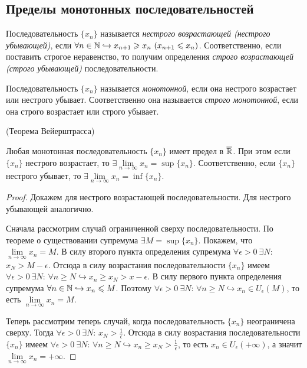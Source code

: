 \subsection{Пределы монотонных последовательностей}

\begin{definition}
    Последовательность $\{ x_{n} \}$ называется \textit{нестрого возрастающей (нестрого убывающей)}, если $\forall n \in \mathbb{N} \hookrightarrow x_{n + 1} \geqslant x_{n} \  (x_{n + 1} \leqslant x_{n})$. Соответственно, если поставить строгое неравенство, то получим определения \textit{строго возрастающей (строго убывающей)} последовательности.
\end{definition}
\begin{definition}
    Последовательность $\{ x_{n} \}$ называется \textit{монотонной}, если она нестрого возрастает или нестрого убывает. Соответственно она называется \textit{строго монотонной}, если она строго возрастает или строго убывает.
\end{definition}
\begin{theorem}
    \hypertarget{thm2.6}{(Теорема Вейерштрасса)} Любая монотонная последовательность $\{ x_{n} \}$ имеет предел в $\overline{\mathbb{R}}$. При этом если $\{ x_{n} \}$ нестрого возрастает, то $\exists \lim\limits_{n\to \infty} x_{n} = \sup \{ x_{n} \}$. Соответственно, если $\{ x_{n} \}$ нестрого убывает, то $\exists \lim\limits_{n\to \infty} x_{n} = \inf \{ x_{n} \}$.
\end{theorem}
\begin{proof}
    Докажем для нестрого возрастающей последовательности. Для нестрого убывающей аналогично.

    Сначала рассмотрим случай ограниченной сверху последовательности. По теореме о существовании супремума $\exists M = \sup \{ x_{n} \}$. Покажем, что $\lim\limits_{n\to \infty} x_{n} = M$. В силу второго пункта определения супремума $\forall \epsilon > 0 \  \exists N$: $x_{N} > M - \epsilon$. Отсюда в силу возрастания последовательности $\{ x_{n} \}$ имеем $\forall \epsilon > 0 \  \exists N$: $\forall n \geq N \hookrightarrow x_{n} \geq x_{N} > x - \epsilon$. В силу первого пункта определения супремума $\forall n \in \mathbb{N} \hookrightarrow x_{n} \leqslant M$. Поэтому $\forall \epsilon > 0  \  \exists N$: $\forall n \geq N \hookrightarrow x_{n} \in U_{\epsilon} (M)$, то есть $\lim\limits_{n\to \infty } x_{n} = M$.

    Теперь рассмотрим теперь случай, когда последовательность $\{ x_{n} \}$ неограничена сверху. Тогда $\forall \epsilon > 0 \  \exists N$: $x_{N} > \frac{1}{\epsilon}$. Отсюда в силу возрастания последовательности $\{ x_{n} \}$ имеем $\forall \epsilon > 0 \  \exists N$: $\forall n \geq N \hookrightarrow x_{n} \geq x_{N} > \frac{1}{\epsilon}$, то есть $x_{n} \in U_{\epsilon} (+ \infty)$, а значит $\lim\limits_{n\to \infty} x_{n} = +\infty.$
\end{proof}

